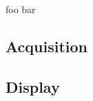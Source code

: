 foo bar

\subsection{\label{sec::Acquisition}Acquisition}

\subsection{\label{sec::Display}Display}
